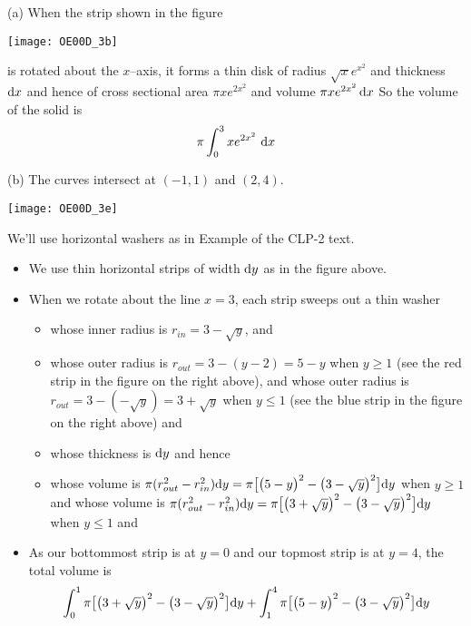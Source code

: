 \begin{solution} (a)
When the strip shown in the figure
\begin{center}
       \texttt{[image: OE00D\_3b]}
\end{center}

\noindent  is rotated about the $x$--axis, it
forms a thin disk of radius $\sqrt{x}e^{x^2}$  and thickness $\mathrm{d}x$
and hence of cross sectional area $\pi xe^{2x^2}$ and volume $\pi xe^{2x^2}\,\mathrm{d}x$
So the volume of the solid is
\begin{align*}
\pi\int_{0}^{3} xe^{2x^2}\ \mathrm{d}x
\end{align*}


\noindent (b)
The curves intersect at $(-1,1)$ and $(2,4)$.

\begin{center}
       \texttt{[image: OE00D\_3e]}
\end{center}

\noindent
We'll use horizontal washers as in Example  
of the %
CLP-2 text.
 \begin{itemize}
\item We use thin horizontal  strips of width $\mathrm{d}y$ as in the figure  above.

\item When we rotate about the line $x=3$, each strip
sweeps out a thin washer
\begin{itemize}
\item
whose inner radius is $r_{in}=3-\sqrt{y}$, and
\item
whose outer radius is $r_{out}=3-(y-2)=5-y$ when $y\ge 1$
(see the red strip in the figure on the right above),  and
whose outer radius is $r_{out}= 3-(-\sqrt{y})=3+\sqrt{y}$ when $y\le 1$
(see the blue strip in the figure on the right above) and
\item
whose thickness is $\mathrm{d}y$ and hence
\item
whose volume is
$\pi(r_{out}^2 - r_{in}^2)\mathrm{d}y
       = \pi\big[\big(5-y\big)^2-\big(3-\sqrt{y}\big)^2\big]\mathrm{d}y$
when $y\ge 1$ and  whose volume is
$\pi(r_{out}^2 - r_{in}^2)\mathrm{d}y
    =\pi\big[\big(3+\sqrt{y}\big)^2-\big(3-\sqrt{y}\big)^2\big]\mathrm{d}y$
when $y\le 1$ and

\end{itemize}
\item As our bottommost strip is at $y=0$ and our topmost
strip is at $y=4$, the total volume is
\begin{align*}
\int _0^1  \pi\big[\big(3+\sqrt{y}\big)^2-\big(3-\sqrt{y}\big)^2\big]\mathrm{d}y
+\int _ 1^4  \pi\big[\big(5-y\big)^2-\big(3-\sqrt{y}\big)^2\big]\mathrm{d}y
\end{align*}
\end{itemize}

\end{solution}

